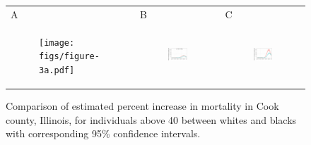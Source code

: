 \documentclass[11pt]{article}
\begin{document}
\begin{figure}[ht]
	\begin{tabular}{lll}
	A&B&C\\
	\begin{subfigure}[t]{0.3\linewidth}
		\centering
		\texttt{[image: figs/figure-3a.pdf]} 
	\end{subfigure}&
	\begin{subfigure}[t]{0.3\linewidth}
		\centering
		\includegraphics[width=1\linewidth]{figs/figure-3b.pdf}
	\end{subfigure}&
	\begin{subfigure}[t]{0.3\linewidth}
		\centering
		\includegraphics[width=1\linewidth]{figs/figure-3c.pdf}
	\end{subfigure}\\
	\end{tabular}
	\caption{Comparison of estimated percent increase in mortality in Cook county, Illinois, for individuals above 40 between whites and blacks with corresponding 95\% confidence intervals.}
	\label{fig:cook-white-v-black}
\end{figure}
\end{document}
